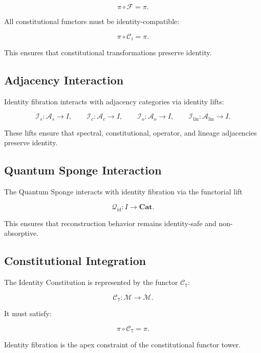 \[
\pi \circ \mathcal{F} = \pi.
\]

All constitutional functors must be identity-compatible:

\[
\pi \circ \mathcal{C}_i = \pi.
\]

This ensures that constitutional transformations preserve identity.


\subsection{Adjacency Interaction}

Identity fibration interacts with adjacency categories via identity lifts:

\[
\mathcal{I}_s : \mathcal{A}_s \to I, \qquad
\mathcal{I}_c : \mathcal{A}_c \to I, \qquad
\mathcal{I}_o : \mathcal{A}_o \to I, \qquad
\mathcal{I}_{\mathrm{lin}} : \mathcal{A}_{\mathrm{lin}} \to I.
\]

These lifts ensure that spectral, constitutional, operator, and lineage
adjacencies preserve identity.


\subsection{Quantum Sponge Interaction}

The Quantum Sponge interacts with identity fibration via the functorial lift

\[
\mathcal{Q}_{\mathrm{id}} :
I \to \mathbf{Cat}.
\]

This ensures that reconstruction behavior remains identity-safe and
non-absorptive.


\subsection{Constitutional Integration}

The Identity Constitution is represented by the functor $\mathcal{C}_7$:

\[
\mathcal{C}_7 : \mathcal{M} \to \mathcal{M}.
\]

It must satisfy:

\[
\pi \circ \mathcal{C}_7 = \pi.
\]

Identity fibration is the apex constraint of the constitutional functor
tower.

